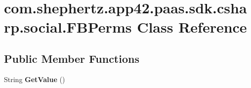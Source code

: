 \hypertarget{classcom_1_1shephertz_1_1app42_1_1paas_1_1sdk_1_1csharp_1_1social_1_1_f_b_perms}{\section{com.\+shephertz.\+app42.\+paas.\+sdk.\+csharp.\+social.\+F\+B\+Perms Class Reference}
\label{classcom_1_1shephertz_1_1app42_1_1paas_1_1sdk_1_1csharp_1_1social_1_1_f_b_perms}
}
\subsection*{Public Member Functions}
\begin{DoxyCompactItemize}
\item 
\hypertarget{classcom_1_1shephertz_1_1app42_1_1paas_1_1sdk_1_1csharp_1_1social_1_1_f_b_perms_a83c7fc462c069bb1bd2efedb4b6bfd18}{String {\bfseries Get\+Value} ()}\label{classcom_1_1shephertz_1_1app42_1_1paas_1_1sdk_1_1csharp_1_1social_1_1_f_b_perms_a83c7fc462c069bb1bd2efedb4b6bfd18}

\end{DoxyCompactItemize}
